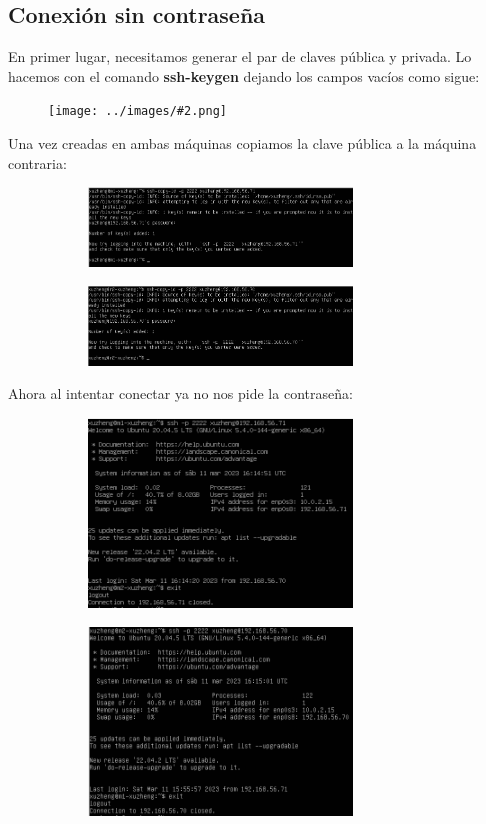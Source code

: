 \documentclass[twoside]{article}
\newcommand{\image}[2]{
\begin{figure}[H]
    \texttt{[image: ../images/\#2.png]}
    \centering
\end{figure}
}
\begin{document}
\subsection{Conexión sin contraseña}
En primer lugar, necesitamos generar el par de claves pública y privada. Lo hacemos con el comando \textbf{ssh-keygen} dejando los campos vacíos como sigue:
\image{8}{36}
Una vez creadas en ambas máquinas copiamos la clave pública a la máquina contraria:
\begin{figure}[H]
    \centering
    \begin{subfigure}{.5\textwidth}
        \centering
        \includegraphics[width=7cm]{../images/37.png}
    \end{subfigure}%
    \begin{subfigure}{.5\textwidth}
        \centering
        \includegraphics[width=7cm]{../images/38.png}
    \end{subfigure}
\end{figure}

Ahora al intentar conectar ya no nos pide la contraseña:
\begin{figure}[H]
    \centering
    \begin{subfigure}{.5\textwidth}
        \centering
        \includegraphics[width=7cm]{../images/39.png}
    \end{subfigure}%
    \begin{subfigure}{.5\textwidth}
        \centering
        \includegraphics[width=7cm]{../images/40.png}
    \end{subfigure}
\end{figure}
\end{document}
